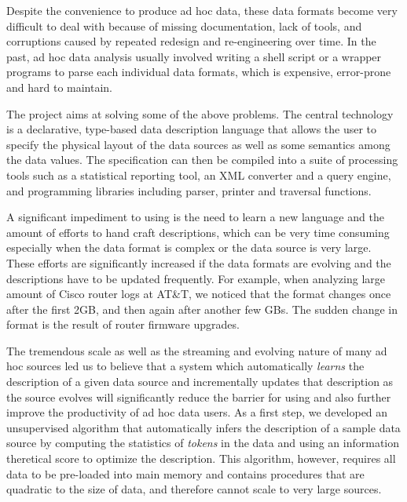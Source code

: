 Despite the convenience to produce ad hoc data, these
data formats become very difficult to deal with because of missing
documentation, lack of tools, and corruptions caused by
repeated redesign and re-engineering over time. 
In the past, ad hoc data analysis usually involved
writing a shell script or a wrapper programs to parse each 
individual data formats, which is expensive, error-prone and 
hard to maintain. 

The \pads{} project \cite{padsweb} aims at solving some of the above 
problems. The central technology is a declarative, type-based 
data description language that allows the user to specify the physical
layout of the data sources as well as some semantics among the data
values. The specification can then be compiled into a suite of
processing tools such as a statistical reporting tool, an 
XML converter and a query engine, and programming libraries 
including parser, printer and traversal functions. 

A significant impediment to using \pads{} is the need to learn
a new language and the amount of efforts to
hand craft \pads{} descriptions, which can be very time consuming
especially when the data format is complex or the data source is
very large. These efforts are significantly increased if the data
formats are evolving and the descriptions have to be updated 
frequently. For example, when analyzing large amount of Cisco router
logs at AT\&T, we noticed that the format changes once after the first 2GB, 
and then again after another few GBs. The sudden change in format is
the result of router firmware upgrades.

The tremendous scale as well as the streaming and evolving nature of many ad hoc
sources led us to believe that a system which automatically {\em learns}
the \pads{} description of a given data source and incrementally updates that
description as the source evolves will significantly reduce the barrier for
using \pads{} and also further improve the productivity of ad hoc data users.
As a first step, we developed an unsupervised algorithm \learnpads{}
\cite{Fisher+:dirttoshovels,fisher+:sigmod08}
that automatically infers the \pads{} description of a sample data source by 
computing the statistics of {\em tokens} in the data and using an information
theretical score to optimize the description. This algorithm, however,
requires all data to be pre-loaded into main memory and contains procedures 
that are quadratic to the size of data, 
and therefore cannot scale to very large sources. 

